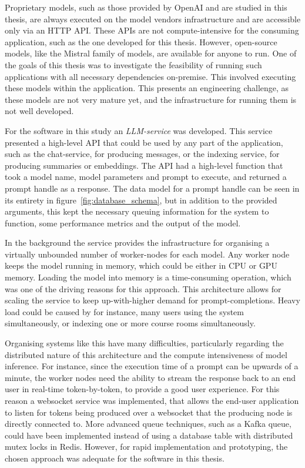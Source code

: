Proprietary models, such as those provided by OpenAI and are studied in this thesis, are always executed on the model vendors infrastructure and are accessible only via an HTTP API. These APIs are not compute-intensive for the consuming application, such as the one developed for this thesis. However, open-source models, like the Mistral family of models, are available for anyone to run. One of the goals of this thesis was to investigate the feasibility of running such applications with all necessary dependencies on-premise. This involved executing these models within the application. This presents an engineering challenge, as these models are not very mature yet, and the infrastructure for running them is not well developed.


For the software in this study an \textit{LLM-service} was developed. This service presented a high-level API that could be used by any part of the application, such as the chat-service, for producing messages, or the indexing service, for producing summaries or embeddings. The API had a high-level function that took a model name, model parameters and prompt to execute, and returned a prompt handle as a response. The data model for a prompt handle can be seen in its entirety in figure~\ref{fig:database_schema}, but in addition to the provided arguments, this kept the necessary queuing information for the system to function, some performance metrics and the output of the model.


In the background the service provides the infrastructure for organising a virtually unbounded number of worker-nodes for each model. Any worker node keeps the model running in memory, which could be either in CPU or GPU memory. Loading the model into memory is a time-consuming operation, which was one of the driving reasons for this approach. This architecture allows for scaling the service to keep up-with-higher demand for prompt-completions. Heavy load could be caused by for instance, many users using the system simultaneously, or indexing one or more course rooms simultaneously.


Organising systems like this have many difficulties, particularly regarding the distributed nature of this architecture and the compute intensiveness of model inference. For instance, since the execution time of a prompt can be upwards of a minute, the worker nodes need the ability to stream the response back to an end user in real-time token-by-token, to provide a good user experience. For this reason a websocket service was implemented, that allows the end-user application to listen for tokens being produced over a websocket that the producing node is directly connected to. More advanced queue techniques, such as a Kafka queue, could have been implemented instead of using a database table with distributed mutex locks in Redis. However, for rapid implementation and prototyping, the chosen approach was adequate for the software in this thesis.
